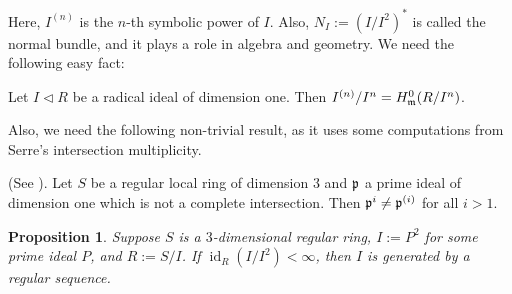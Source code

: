 \documentclass[10. pt,a4paper]{amsart}
\newtheorem{proposition}[theorem]{Proposition}
\theoremstyle{definition}
\theoremstyle{remark}
\newcommand{\id}{\operatorname{id}}
\newcommand{\fm}{\frak{m}}
\newcommand{\fp}{\frak{p}}
\begin{document}
Here, $I^{(n)}$ is the $n$-th symbolic power of $I$. Also, $N_I:=(I/I^2)^\ast$ is called the normal bundle, and it plays a role in algebra and geometry. We need the following easy fact:

\begin{fact}\label{tr}
	Let $I \lhd R$ be a radical ideal of dimension one. Then $I^{(n)} / I^n = H^0_{\fm}(R/I^n)$.
\end{fact}
Also, we need the following non-trivial result, as it uses some computations from Serre's intersection multiplicity.  
\begin{fact}\label{nonf}
 (See \cite[Corollary 2.5]{h}). Let $S$ be a regular local ring of dimension $3$ and $\fp$ a prime ideal of dimension one which is not a complete intersection. Then $\fp^i \neq \fp^{(i)}$ for all $i > 1$.
\end{fact}
\begin{proposition}\label{6.1d}
	Suppose $S$ is a $3$-dimensional regular ring, $I := P^2$ for some prime ideal $P$, and $R := S/I$. If $\id_R(I/I^2) < \infty$, then $I$ is generated by a regular sequence.
\end{proposition}
\end{document}
